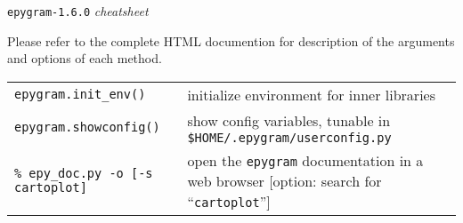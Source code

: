 \documentclass[a4paper,10pt]{article}
\date{\vspace{-1.5cm}}
\begin{document}
\huge
\begin{center}
\texttt{epygram-1.6.0} \textit{cheatsheet}
\end{center}
\normalsize

Please refer to the complete HTML documention for description of the arguments and options of each method.\\

\begin{tabular}{|p{9.5cm}|p{9.5cm}|}
\rowcolor{gray!50}
\multicolumn{2}{|c|}{\textbf{Miscellaneous}}\\
\hline
\texttt{epygram.init\_env()} & initialize environment for inner libraries\\
\texttt{epygram.showconfig()} & show config variables, tunable in \texttt{\$HOME/.epygram/userconfig.py}\\
\texttt{\% epy\_doc.py -o [-s cartoplot]} & open the \texttt{epygram} documentation in a web browser [option: search for ``\texttt{cartoplot}'']\\
\hline
\end{tabular}\\
\\

\end{document}
